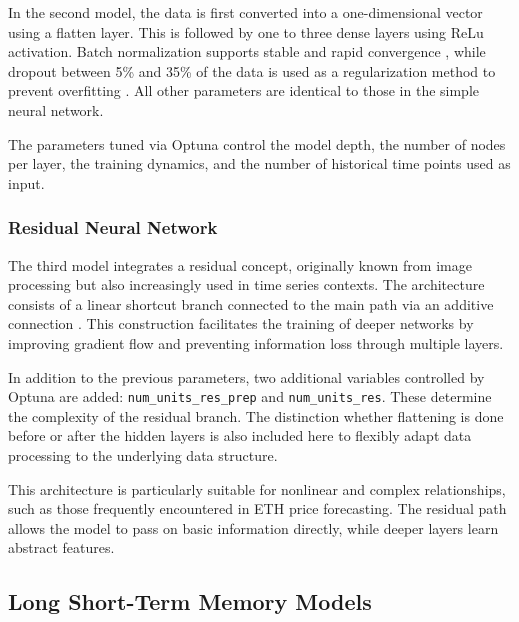 In the second model, the data is first converted into a one-dimensional vector using a flatten layer.
This is followed by one to three dense layers using ReLu activation.
Batch normalization supports stable and rapid convergence \cite{batch-normalization}, while dropout between 5\% and 35\% of the data is used as a regularization method to prevent overfitting \cite{keras-dropout}.
All other parameters are identical to those in the simple neural network.

The parameters tuned via Optuna control the model depth, the number of nodes per layer, the training dynamics, and the number of historical time points used as input.



\subsubsection{Residual Neural Network}

The third model integrates a residual concept, originally known from image processing but also increasingly used in time series contexts.
The architecture consists of a linear shortcut branch connected to the main path via an additive connection \cite{residual-nn}.
This construction facilitates the training of deeper networks by improving gradient flow and preventing information loss through multiple layers.

In addition to the previous parameters, two additional variables controlled by Optuna are added: \verb|num_units_res_prep| and \verb|num_units_res|.
These determine the complexity of the residual branch.
The distinction whether flattening is done before or after the hidden layers is also included here to flexibly adapt data processing to the underlying data structure.

This architecture is particularly suitable for nonlinear and complex relationships, such as those frequently encountered in ETH price forecasting.
The residual path allows the model to pass on basic information directly, while deeper layers learn abstract features.



\subsection{Long Short-Term Memory Models}

